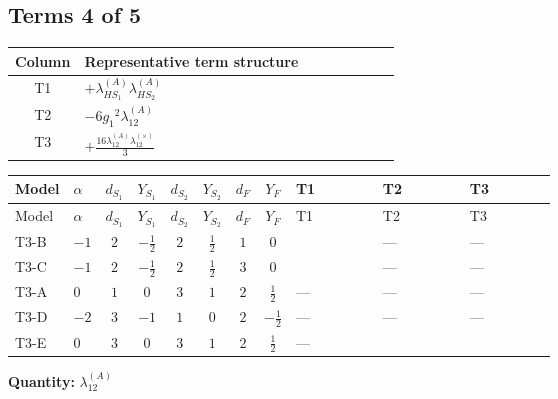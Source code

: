 \documentclass[8pt]{article}
\begin{document}
\begin{landscape}
\subsection*{Terms 4 of 5}
\begin{center}
\begin{tabular}{@{}c >{\raggedright\arraybackslash}p{0.82\linewidth}@{}}
\toprule
Column & Representative term structure \\
\midrule
T1 & \(\displaystyle +{\lambda_{HS_1}^{(A)}} {\lambda_{HS_2}^{(A)}}\) \\
\midrule
T2 & \(\displaystyle -6 {g_1}^2 {\lambda_{12}^{(A)}}\) \\
\midrule
T3 & \(\displaystyle +\frac{16 {\lambda_{12}^{(A)}} {\lambda_{12}^{(\times)}}}{3}\) \\
\midrule
\bottomrule
\end{tabular}
\end{center}
\smallskip
\tiny
\begin{longtable}{@{}llcccccc >{\raggedright\arraybackslash}p{0.21\linewidth} >{\raggedright\arraybackslash}p{0.21\linewidth} >{\raggedright\arraybackslash}p{0.21\linewidth}@{}}
\toprule
Model & $\alpha$ & $d_{S_1}$ & $Y_{S_1}$ & $d_{S_2}$ & $Y_{S_2}$ & $d_F$ & $Y_F$ & T1 & T2 & T3 \\
\midrule
\endfirsthead
\toprule
Model & $\alpha$ & $d_{S_1}$ & $Y_{S_1}$ & $d_{S_2}$ & $Y_{S_2}$ & $d_F$ & $Y_F$ & T1 & T2 & T3 \\
\midrule
\endhead
T3-B & $-1$ & $2$ & $-\frac{1}{2}$ & $2$ & $\frac{1}{2}$ & $1$ & $0$ & \scriptsize\adjustbox{max width=\linewidth}{$\begin{gathered} +{\lambda_{HS_1}^{(A)}} {\lambda_{HS_2}^{(A)}}\end{gathered}$} & --- & --- \\
\midrule
T3-C & $-1$ & $2$ & $-\frac{1}{2}$ & $2$ & $\frac{1}{2}$ & $3$ & $0$ & \scriptsize\adjustbox{max width=\linewidth}{$\begin{gathered} +{\lambda_{HS_1}^{(A)}} {\lambda_{HS_2}^{(A)}}\end{gathered}$} & --- & --- \\
\midrule
T3-A & $0$ & $1$ & $0$ & $3$ & $1$ & $2$ & $\frac{1}{2}$ & --- & --- & --- \\
\midrule
T3-D & $-2$ & $3$ & $-1$ & $1$ & $0$ & $2$ & $-\frac{1}{2}$ & --- & --- & --- \\
\midrule
T3-E & $0$ & $3$ & $0$ & $3$ & $1$ & $2$ & $\frac{1}{2}$ & --- & \scriptsize\adjustbox{max width=\linewidth}{$\begin{gathered} -6 {g_1}^2 {\lambda_{12}^{(A)}}\end{gathered}$} & \scriptsize\adjustbox{max width=\linewidth}{$\begin{gathered} +\frac{16 {\lambda_{12}^{(A)}} {\lambda_{12}^{(\times)}}}{3}\end{gathered}$} \\
\midrule
\bottomrule
\end{longtable}
\clearpage
\noindent\textbf{Quantity: }$\lambda_{12}^{(A)}$\par\smallskip

\end{landscape}
\end{document}
